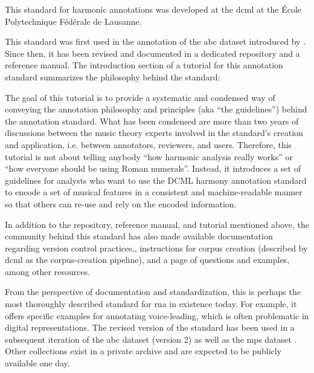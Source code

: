 

This standard for harmonic annotations was developed at the
\gls{dcml} at the \'Ecole Polytechnique F\'ed\'erale de
Lausanne.

This standard was first used in the annotation of the
\gls{abc} dataset introduced by
\textcite{neuwirth2018annotated}. Since then, it has been
revised and documented in a dedicated
repository
and a reference
manual.
The introduction section of a tutorial for this annotation
standard summarizes the philosophy behind the
standard:

\begin{italicsquote}
    The goal of this tutorial is to provide a systematic and
    condensed way of conveying the annotation philosophy and
    principles (aka ``the guidelines'') behind the
    annotation standard. What has been condensed are more
    than two years of discussions between the music theory
    experts involved in the standard's creation and
    application, i.e. between annotators, reviewers, and
    users. Therefore, this tutorial is not about telling
    anybody ``how harmonic analysis really works'' or ``how
    everyone should be using Roman numerals''. Instead, it
    introduces a set of guidelines for analysts who want to
    use the DCML harmony annotation standard to encode a set
    of musical features in a consistent and machine-readable
    manner so that others can re-use and rely on the encoded
    information.
\end{italicsquote}

In addition to the repository, reference manual, and
tutorial mentioned above, the community behind this standard
has also made available documentation regarding version
control
practices,,
instructions for corpus creation (described by \gls{dcml} as
the corpus-creation
pipeline),
and a page of questions and
examples,
among other resources.

From the perspective of documentation and standardization,
this is perhaps the most thoroughly described standard for
\gls{rna} in existence today. For example, it offers
specific examples for annotating
voice-leading,
which is often problematic in digital representations. The
revised version of the standard has been used in a
subsequent iteration of the \gls{abc} dataset (version 2) as
well as the \gls{mps} dataset
\parencite{hentschel2021annotated}. Other collections exist
in a private archive and are expected to be publicly
available one day.
